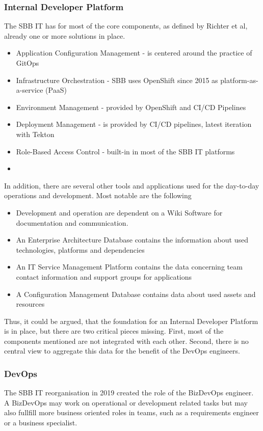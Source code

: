 \documentclass[a4paper,12pt]{article}
\begin{document}
    \subsubsection{Internal Developer Platform}
    The SBB IT has for most of the core components, as defined by Richter et al\parencite{richteretal}, already one or more solutions
    in place.
    \begin{itemize}
        \item Application Configuration Management - is centered around the practice of GitOps\parencite{hashicorpvault}
        \item Infrastructure Orchestration - SBB uses OpenShift since 2015\parencite{rhsbbopenshift} as platform-as-a-service (PaaS)
        \item Environment Management - provided by OpenShift and CI/CD Pipelines
        \item Deployment Management - is provided by CI/CD pipelines, latest iteration with Tekton\parencite{sbbtekton}
        \item Role-Based Access Control - built-in in most of the SBB IT platforms
    \item \end{itemize}
    In addition, there are several other tools and applications used for the day-to-day operations and development.
    Most notable are the following
    \begin{itemize}
        \item Development and operation are dependent on a Wiki Software for documentation and communication.
        \item An Enterprise Architecture Database contains the information about used technologies, platforms and dependencies
        \item An IT Service Management Platform contains the data concerning team contact information and support groups for applications
        \item A Configuration Management Database contains data about used assets and resources
    \end{itemize}
    Thus, it could be argued, that the foundation for an Internal Developer Platform is in place, but there are two
    critical pieces missing.
    First, most of the components mentioned are not integrated with each other.
    Second, there is no central view to aggregate this data for the benefit of the DevOps engineers.

    \subsubsection{DevOps}
    The SBB IT reorganisation in 2019 created the role of the BizDevOps engineer.
    A BizDevOps may work on operational or development related tasks but may also fullfill more business oriented roles
    in teams, such as a requirements engineer or a business specialist.
\end{document}
